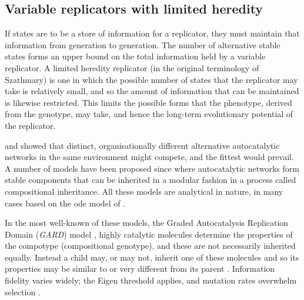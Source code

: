 \subsection{Variable replicators with limited heredity}\label{variable-replicators}

If states are to be a store of information for a replicator, they must maintain that information from generation to generation. The number of alternative stable states forms an upper bound on the total information held by a variable replicator. A limited heredity replicator (in the original terminology of Szathmary) is one in which the possible number of states that the replicator may take is relatively small, and so the amount of information that can be maintained is likewise restricted. This limits the possible forms that the phenotype, derived from the genotype, may take, and hence the long-term evolutionary potential of the replicator.

\Textcite{Ganti:2003hl} and  \textcite{Eigen1971} showed that distinct, organisationally different alternative autocatalytic networks in the same environment might compete, and the fittest would prevail. A number of models have been proposed since where autocatalytic networks form stable components that can be inherited in a modular fashion in a process called compositional inheritance. All these models are analytical in nature, in many cases based on the \gls{ode} model of \cite{Farmer1986}.


In the most well-known of these models, the Graded Autocatalysis Replication Domain (\emph{GARD}) model \parencite{Segre1998}, highly catalytic molecules determine the properties of the compotype (compositional genotype), and these are not necessarily inherited equally. Instead a child may, or may not, inherit one of these molecules and so its properties may be similar to or very different from its parent \parencite{Vasas2015, Vasas2012, Vasas2012a}. Information fidelity varies widely; the Eigen threshold \parencite{Eigen1971} applies, and mutation rates overwhelm selection \parencite{Vasas2015, Vasas2012, Vasas2012a}.


